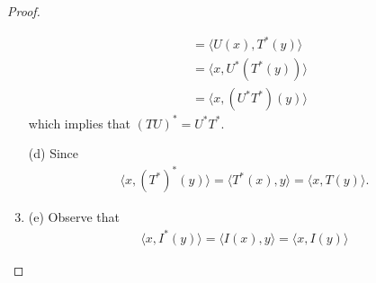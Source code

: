 \begin{proof}
\begin{enumerate}
\begin{align*}
                                            &= \langle U(x) , T^{*}(y) \rangle \\
                                            &= \langle x  ,  U^{*}(T^{*}(y)) \rangle \\
                                            &= \langle x , (U^{*}T^{*})(y) \rangle
        \end{align*}
        which implies that \(  (TU)^{*} = U^{*} T^{*} \).
    \item[(d)] Since
        \begin{align*}
            \langle x , (T^{*})^{*}(y) \rangle = \langle T^{*}(x) , y  \rangle 
                                               = \langle x , T(y) \rangle.
        \end{align*}
    \item{(e)} Observe that
        \begin{align*}
            \langle x , I^{*}(y) \rangle = \langle I(x) , y  \rangle = \langle x  ,  I(y) \rangle
        \end{align*}
\end{enumerate}
\end{proof}

